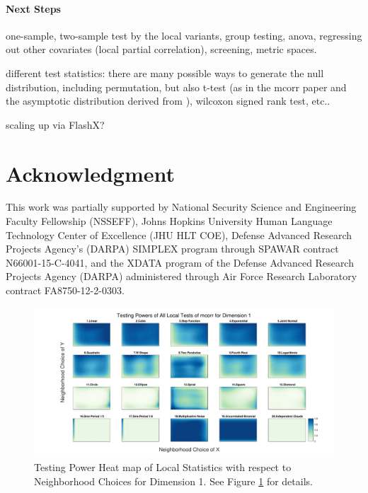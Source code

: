 \documentclass[11pt]{article}
\newcommand{\jv}[1]{{\color{red}{#1}}}
\newcommand{\cs}[1]{{\color{blue}{#1}}}
\begin{document}
\paragraph{Next Steps}



one-sample, two-sample test by the local variants, group testing, anova, regressing out other covariates (local partial correlation), screening, metric spaces.

different test statistics: there are many possible ways to generate the null distribution, including permutation, but also t-test (as in the mcorr paper \cite{SzekelyRizzo2013a} and the asymptotic distribution derived from \cite{GrettonEtAl2012}), wilcoxon signed rank test, etc..

scaling up via FlashX?

\section*{Acknowledgment}
This work was partially supported by 
% 
National Security Science and Engineering Faculty Fellowship (NSSEFF), 
% 
Johns Hopkins University Human Language Technology Center of Excellence (JHU HLT COE), 
% 
Defense Advanced Research Projects Agency's (DARPA) SIMPLEX program through SPAWAR contract N66001-15-C-4041, 
% 
and the XDATA program of the Defense Advanced Research Projects Agency (DARPA) administered through Air Force Research Laboratory contract FA8750-12-2-0303.



\appendix
\setcounter{figure}{0}
\renewcommand\thefigure{\arabic{figure}} 


\begin{figure}[htbp]
\includegraphics[width=1.0\textwidth]{../Figures/Fig2}
\caption{Testing Power Heat map of Local Statistics with respect to Neighborhood Choices for Dimension 1. See Figure \ref{figSim2} for details. \jv{fix (1,1) here too please?}
\cs{if you mean the smallest scale should be at the lowest left corner, it is already the case here. }
}
\label{figSim2}
\end{figure}
\end{document}
